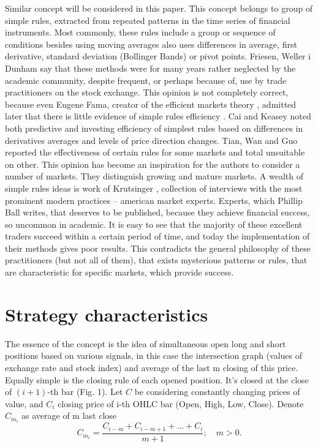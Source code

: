 \documentclass{tewiart}
\begin{document}
Similar concept will be considered in this paper. This concept belongs to group of simple rules, extracted from repeated patterns in the time series of financial instruments. Most commonly, these rules include a group or sequence of conditions besides using moving averages also uses differences in average, first derivative, standard deviation (Bollinger Bands) or pivot points. Friesen, Weller i Dunham \cite{friesen09} say that these methods were for many years rather neglected by the academic community, despite frequent, or perhaps because of, use by trade practitioners on the stock exchange. This opinion is not completely correct, because even Eugene Fama, creator of the efficient markets theory \cite{fama91}, admitted later that  there is little evidence of simple rules efficiency \cite{fama98}. Cai and Keasey \cite{cai05} noted both predictive and investing efficiency of simplest rules based on differences in derivatives averages and levels of price direction changes. Tian, Wan and Guo \cite{tian02} reported the effectiveness of certain rules for some markets and total unsuitable on other. This opinion has become an inspiration for the authors to consider a number of markets. They distinguish growing and mature markets. A wealth of simple rules ideas is work of Krutsinger \cite{krutsinger99}, collection of interviews with the most prominent modern practices – american market experts. Experts, which Phillip Ball \cite{ball07} writes, that deserves to be published, because they achieve financial success, so uncommon in academic.
It is easy to see that the majority of these excellent traders succeed within a certain period of time, and today the implementation of their methods gives poor results. This contradicts the general philosophy of these practitioners (but not all of them), that exists mysterious patterns or rules, that are characteristic for specific markets, which provide success.
\section{Strategy characteristics}
\indent The essence of the concept is the idea of simultaneous open long and short positions based on various signals, in this case the intersection graph (values of exchange rate  and stock index) and average of the last m closing of this price.\\
Equally simple is the closing rule of each opened position. It's closed at the close of $(i+1)$-th bar (Fig. 1).
Let $C$ be considering constantly changing prices of value, and $C_i$ closing price of i-th OHLC bar (Open, High, Low, Close). Denote $C_{m_{i}}$ as average of m last close
\begin{equation} \label{label-of-equation-1}
  C_{m_{i}} = \frac{C_{i-m} + C_{i-m+1} + … + C_{i}}{m+1}; \hspace{1em}m>0. 
\end{equation}
 
\end{document}
